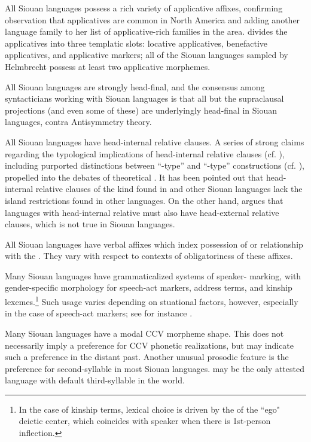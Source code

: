 \begin{refsection}
All Siouan languages possess a rich variety of applicative affixes, confirming  observation that applicatives are common in North America and adding another language family to her list of applicative-rich families in the area. \citet{Helmbrecht2006a} divides the applicatives into three templatic slots: locative applicatives, benefactive applicatives, and applicative markers; all of the Siouan languages sampled by Helmbrecht possess at least two applicative morphemes.


All Siouan languages are strongly head-final, and the consensus among syntacticians working with Siouan languages is that all but the supraclausal projections (and even some of these) are underlyingly head-final in Siouan languages, contra  Antisymmetry theory.


All Siouan languages have head-internal relative clauses. A series of strong claims regarding the typological implications of head-internal relative clauses (cf. \citealt{Cole1987, Murasugi2000}), including purported distinctions between ``-type'' and ``-type'' constructions (cf. \citealt{Watanabe2004,Williamson1987,Bonneau1992}), propelled  into the debates of theoretical . It has been pointed out that head-internal relative clauses of the kind found in  and other Siouan languages lack the island restrictions found in other languages. On the other hand, \citet{Murasugi2000} argues that languages with head-internal relative  must also have head-external relative clauses, which is not true in Siouan languages.


All Siouan languages have verbal affixes which index  possession of or relationship with the . They vary with respect to contexts of obligatoriness of these affixes.


Many Siouan languages have grammaticalized systems of speaker- marking, with gender-specific morphology for speech-act markers, address terms, and kinship lexemes.\footnote{In the case of kinship terms, lexical choice is driven by the  of the ``ego" deictic center, which coincides with speaker  when there is 1st-person inflection.} Such usage varies depending on stuational factors, however, especially in the case of speech-act markers; see for instance \citet{Trechter1995}.   


Many Siouan languages have a modal CCV morpheme shape. This does not necessarily imply a preference for CCV phonetic realizations, but may indicate such a preference in the distant past. Another unusual prosodic feature is the preference for second-syllable  in most Siouan languages.  may be the only attested language with default third-syllable  in the world.



\end{refsection}
